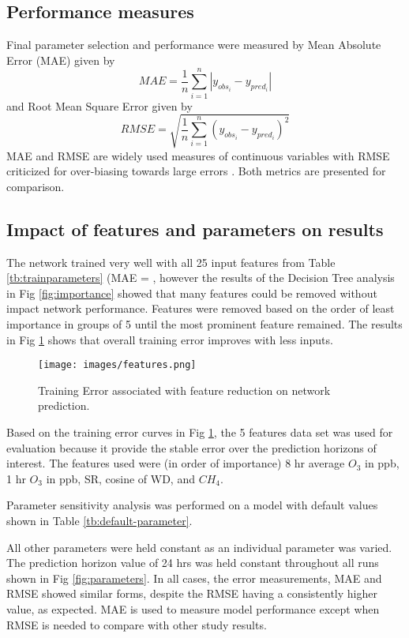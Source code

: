 \documentclass[preprint,12pt,authoryear]{elsarticle}
\begin{document}
\begin{linenumbers}
\subsection{Performance measures}

Final parameter selection and performance were measured by Mean Absolute Error (MAE) given by 
%
\begin{equation}
\label{eq:MAE}
MAE = \frac{1}{n}\sum^{n}_{i=1} \left | y_{obs_{i}}- y_{pred_{i}} \right |
\end{equation}
%
and Root Mean Square Error given by
%
\begin{equation}
\label{eq:RMSE}
RMSE = \sqrt{\frac{1}{n}\sum^{n}_{i=1} \left ( y_{obs_{i}}- y_{pred_{i}} \right )^{2}}
\end{equation}
%
MAE and RMSE are widely used measures of continuous variables with RMSE criticized for over-biasing towards large errors \citep{Chai2014, Willmott2005}. Both metrics are presented for comparison.

\subsection{Impact of features and parameters on results}

The network trained very well with all 25 input features from Table \ref{tb:trainparameters} (MAE = , however the results of the Decision Tree analysis in Fig \ref{fig:importance} showed that many features could be removed without impact network performance. Features were removed based on the order of least importance in groups of 5 until the most prominent feature remained. The results in Fig \ref{fig:features} shows that overall training error improves with less inputs.
%
\begin{figure}[H]
\centering
\texttt{[image: images/features.png]}  %
\caption{Training Error associated with feature reduction on network prediction.}
\label{fig:features}
\end{figure}
%
Based on the training error curves in Fig \ref{fig:features}, the 5 features data set was used for evaluation because it provide the stable error over the prediction horizons of interest. The features used were (in order of importance) 8 hr average $O_{3}$ in ppb, 1 hr $O_{3}$ in ppb, SR, cosine of WD, and $CH_{4}$.

Parameter sensitivity analysis was performed on a model with default values shown in Table \ref{tb:default-parameter}.
%

%
All other parameters were held constant as an individual parameter was varied. The prediction horizon value of 24 hrs was held constant throughout all runs shown in  Fig \ref{fig:parameters}. In all cases, the error measurements, MAE and RMSE showed similar forms, despite the RMSE having a consistently higher value, as expected. MAE is used to measure model performance except when RMSE is needed to compare with other study results.  


\end{linenumbers}
\end{document}
